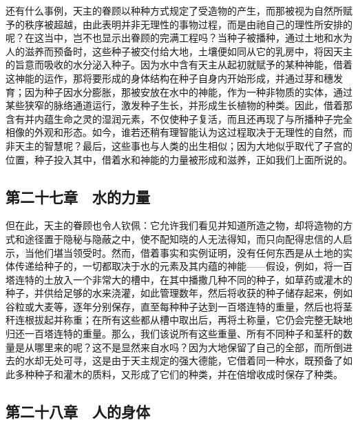 还有什么事例，天主的眷顾以种种方式规定了受造物的产生，而那被视为自然所赋予的秩序被超越，由此表明并非无理性的事物过程，而是由祂自己的理性所安排的呢？在这当中，岂不也显示出眷顾的完满工程吗？当种子被播种，通过土地和水为人的滋养而预备时，这些种子被交付给大地，土壤便如同从它的乳房中，将因天主的旨意而吸收的水分泌入种子。因为水中含有天主从起初就赋予的某种神能，借着这神能的运作，那将要形成的身体结构在种子自身内开始形成，并通过芽和穗发育；因为种子因水分膨胀，那被安放在水中的神能，作为一种非物质的实体，通过某些狭窄的脉络通道运行，激发种子生长，并形成生长植物的种类。因此，借着那含有并内蕴生命之灵的湿润元素，不仅使种子复活，而且还再现了与所播种子完全相像的外观和形态。如今，谁若还稍有理智能认为这过程取决于无理性的自然，而非天主的智慧呢？最后，这些事也与人类的出生相似；因为大地似乎取代了子宫的位置，种子投入其中，借着水和神能的力量被形成和滋养，正如我们上面所说的。\par


\subsection{第二十七章　水的力量}

但在此，天主的眷顾也令人钦佩：它允许我们看见并知道所造之物，却将造物的方式和途径置于隐秘与隐蔽之中，使不配知晓的人无法得知，而只向配得忠信的人启示，当他们堪当领受时。然而，借着事实和实例证明，没有任何东西是从土地的实体传递给种子的，一切都取决于水的元素及其内蕴的神能——假设，例如，将一百塔连特的土放入一个非常大的槽中，在其中播撒几种不同的种子，如草药或灌木的种子，并供给足够的水来浇灌，如此管理数年，然后将收获的种子储存起来，例如谷粒或大麦等，逐年分别保存，直至每种种子达到一百塔连特的重量，然后也将茎秆连根拔起并称重；在所有这些都从槽中取出后，再将土称量，它仍会完整无缺地归还一百塔连特的重量。那么，我们该说所有这些重量、所有不同种子和茎秆的数量是从哪里来的呢？这不是显然来自水吗？因为大地保留了自己的全部，而所倒进去的水却无处可寻，这是由于天主规定的强大德能，它借着同一种水，既预备了如此多种种子和灌木的质料，又形成了它们的种类，并在倍增收成时保存了种类。\par


\subsection{第二十八章　人的身体}

